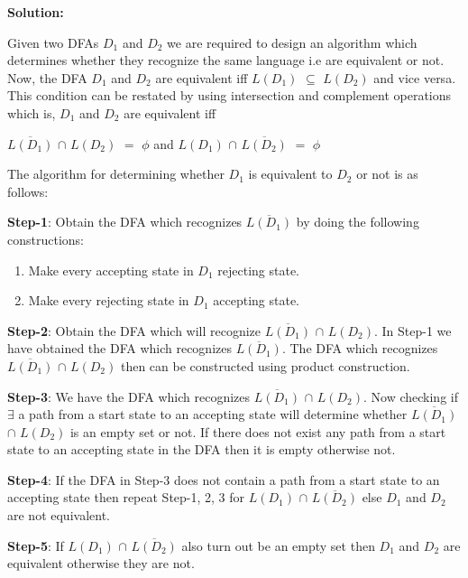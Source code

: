 \documentclass[11pt]{article}
\begin{document}
\begin{enumerate}[1.]
    \textbf{Solution:}
    
    Given two DFAs $D_1$ and $D_2$ we are required to design an algorithm which determines whether they recognize the same language i.e are equivalent or not. Now, the DFA $D_1$ and $D_2$ are equivalent iff $L(D_1)$ $\subseteq$ $L(D_2)$ and vice versa. This condition can be restated by using intersection and complement operations which is,  $D_1$ and $D_2$ are equivalent iff 
    \begin{center}
    $\overline{L(D_1)}$ $\cap$ $L(D_2)$ $=$ $\phi$ and $L(D_1)$ $\cap$ $\overline{L(D_2)}$ $=$ $\phi$
    \end{center}
    
    The algorithm for determining whether $D_1$ is equivalent to $D_2$ or not is as follows:
    
    \textbf{Step-1}: Obtain the DFA which recognizes $\overline{L(D_1)}$ by doing the following constructions:
    
    \begin{enumerate}
        \item Make every accepting state in $D_1$ rejecting state.
        \item Make every rejecting state in $D_1$ accepting state.
    \end{enumerate}
    
    \textbf{Step-2}: Obtain the DFA which will recognize $\overline{L(D_1)}$ $\cap$ $L(D_2)$. In Step-1 we have obtained the DFA which recognizes $\overline{L(D_1)}$. The DFA which recognizes $\overline{L(D_1)}$ $\cap$ $L(D_2)$ then can be constructed using product construction.
    
    \textbf{Step-3}: We have the DFA which recognizes $\overline{L(D_1)}$ $\cap$ $L(D_2)$. Now checking if $\exists$ a path from a start state to an accepting state will determine whether $\overline{L(D_1)}$ $\cap$ $L(D_2)$ is an empty set or not. If there does not exist any path from a start state to an accepting state in the DFA then it is empty otherwise not.
    
    \textbf{Step-4}: If the DFA in Step-3 does not contain a path from a start state to an accepting state then repeat Step-1, 2, 3 for $L(D_1)$ $\cap$ $\overline{L(D_2)}$ else $D_1$ and $D_2$ are not equivalent. 
    
    \textbf{Step-5}: If $L(D_1)$ $\cap$ $\overline{L(D_2)}$ also turn out be an empty set then $D_1$ and $D_2$ are equivalent otherwise they are not.

    
    

\end{enumerate}
\end{document}
